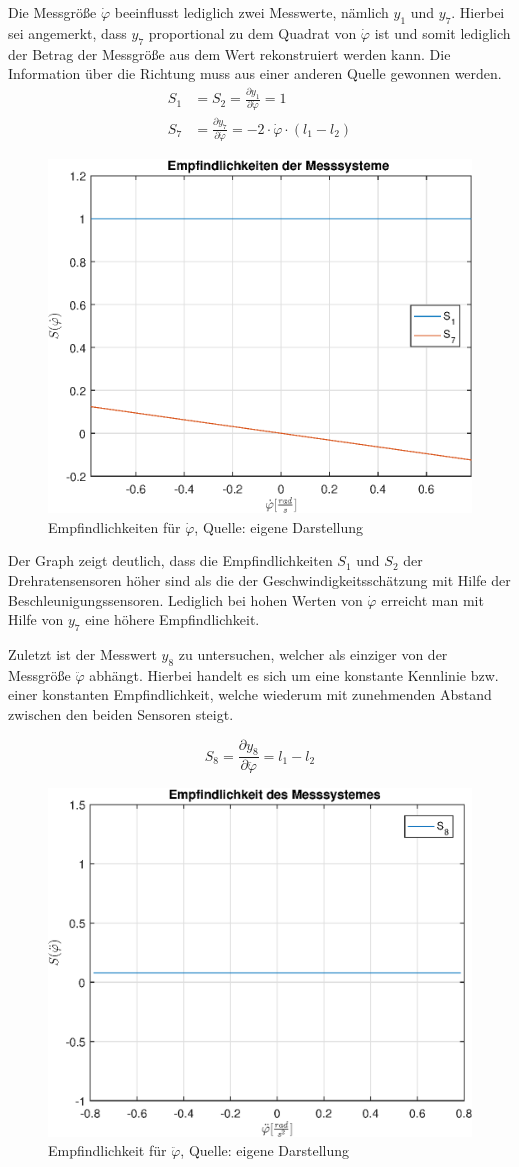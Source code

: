 Die Messgröße $\dot{\varphi}$ beeinflusst lediglich zwei Messwerte, nämlich $y_1$ und $y_7$. Hierbei sei angemerkt, dass $y_7$ proportional zu dem Quadrat von $\dot{\varphi}$ ist und somit lediglich der Betrag der Messgröße aus dem Wert rekonstruiert werden kann. Die Information über die Richtung muss aus einer anderen Quelle gewonnen werden. 
\begin{equation}
\begin{split}
S_1 &= S_2 = \frac{\partial y_1}{\partial \dot{\varphi}} = 1 \\
S_7 &= \frac{\partial y_7}{\partial \dot{\varphi}} = -2\cdot \dot{\varphi}\cdot (l_1 - l_2)
\end{split}
\end{equation}
\begin{figure}[h!]
\centering
\includegraphics[width=0.5\linewidth]{3_Sensorik/img/empfindlichkeit_phi__d}
\caption{Empfindlichkeiten für $\dot{\varphi}$, Quelle: eigene Darstellung}
\end{figure}
Der Graph zeigt deutlich, dass die Empfindlichkeiten $S_1$ und $S_2$ der Drehratensensoren höher sind als die der Geschwindigkeitsschätzung mit Hilfe der Beschleunigungssensoren. Lediglich bei hohen Werten von $\dot{\varphi}$ erreicht man mit Hilfe von $y_7$ eine höhere Empfindlichkeit.

\newpage
Zuletzt ist der Messwert $y_8$ zu untersuchen, welcher als einziger von der Messgröße $\ddot{\varphi}$ abhängt. Hierbei handelt es sich um eine konstante Kennlinie bzw. einer konstanten Empfindlichkeit, welche wiederum mit zunehmenden Abstand zwischen den beiden Sensoren steigt.

\begin{equation}
S_8 = \frac{\partial y_8}{\partial \ddot{\varphi}} = l_1 - l_2
\end{equation}

\begin{figure}[h!]
\centering
\includegraphics[width=0.5\linewidth]{3_Sensorik/img/empfindlichkeit_phi__dd}
\caption{Empfindlichkeit für $\ddot{\varphi}$, Quelle: eigene Darstellung}
\end{figure}


